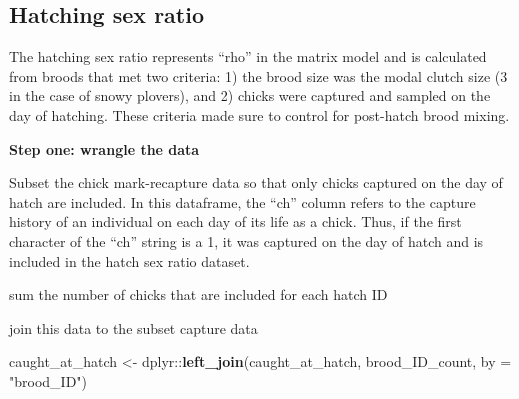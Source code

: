 \documentclass[]{article}
\newenvironment{Shaded}{\begin{snugshade}}{\end{snugshade}}
\newcommand{\KeywordTok}[1]{\textcolor[rgb]{0.13,0.29,0.53}{\textbf{{#1}}}}
\newcommand{\DataTypeTok}[1]{\textcolor[rgb]{0.13,0.29,0.53}{{#1}}}
\newcommand{\DecValTok}[1]{\textcolor[rgb]{0.00,0.00,0.81}{{#1}}}
\newcommand{\StringTok}[1]{\textcolor[rgb]{0.31,0.60,0.02}{{#1}}}
\newcommand{\NormalTok}[1]{{#1}}
\begin{document}
\subsection{Hatching sex ratio}\label{hatching-sex-ratio}

The hatching sex ratio represents ``rho'' in the matrix model and is
calculated from broods that met two criteria: 1) the brood size was the
modal clutch size (3 in the case of snowy plovers), and 2) chicks were
captured and sampled on the day of hatching. These criteria made sure to
control for post-hatch brood mixing.

\textbf{Step one: wrangle the data}

Subset the chick mark-recapture data so that only chicks captured on the
day of hatch are included. In this dataframe, the ``ch'' column refers
to the capture history of an individual on each day of its life as a
chick. Thus, if the first character of the ``ch'' string is a 1, it was
captured on the day of hatch and is included in the hatch sex ratio
dataset.

\begin{Shaded}
\end{Shaded}

sum the number of chicks that are included for each hatch ID

\begin{Shaded}
\end{Shaded}

join this data to the subset capture data

\begin{Shaded}
\begin{Highlighting}[]
\NormalTok{caught_at_hatch <-}\StringTok{ }\NormalTok{dplyr::}\KeywordTok{left_join}\NormalTok{(caught_at_hatch, brood_ID_count, }\DataTypeTok{by =} \StringTok{"brood_ID"}\NormalTok{)}
\end{Highlighting}
\end{Shaded}
\end{document}
